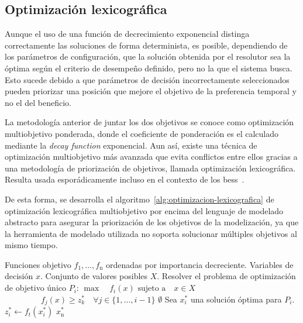 \subsection{Optimización lexicográfica}%
\label{makereference5.3.1}

Aunque el uso de una función de decrecimiento exponencial distinga correctamente las soluciones de forma determinista, es posible, dependiendo de los parámetros de configuración, que la solución obtenida por el resolutor sea la óptima según el criterio de desempeño definido, pero no la que el sistema busca. Esto sucede debido a que parámetros de decisión incorrectamente seleccionados pueden priorizar una posición que mejore el objetivo de la preferencia temporal y no el del beneficio.

La metodología anterior de juntar los dos objetivos se conoce como optimización multiobjetivo ponderada, donde el coeficiente de ponderación es el calculado mediante la \textit{decay function} exponencial. Aun así, existe una técnica de optimización multiobjetivo más avanzada que evita conflictos entre ellos gracias a una metodología de priorización de objetivos, llamada optimización lexicográfica. Resulta usada esporádicamente incluso en el contexto de los \gls{bess}~\cite{karimi2019multi}.

De esta forma, se desarrolla el algoritmo~\ref{alg:optimizacion-lexicografica} de optimización lexicográfica multiobjetivo por encima del lenguaje de modelado abstracto para asegurar la priorización de los objetivos de la modelización, ya que la herramienta de modelado utilizada no soporta solucionar múltiples objetivos al mismo tiempo.

\begin{algorithm}
  \caption{Algoritmo de optimización lexicográfica}%
  \label{alg:optimizacion-lexicografica}
  \begin{algorithmic}
    \Require{} Funciones objetivo \( f_{1}, \dots, f_{\mathrm{n}} \) ordenadas por importancia decreciente.
    \Require{} Variables de decisión \( x \).
    \Require{} Conjunto de valores posibles \( X \).
    \State{} Resolver el problema de optimización de objetivo único \( P_{i} \):
    \Statex{} \hspace{\algorithmicindent} \( \max \quad f_{i}(x) \)
    \Statex{} \hspace{\algorithmicindent} \( \text{sujeto a} \quad x \in X \)
    \Statex{} \hspace{\algorithmicindent} \( \phantom{\text{sujeto a} \quad} f_{j}(x) \geq z_k^* \quad \forall j \in \{1, \dots, i - 1\} \)
    \State{} \Return{} \( \emptyset \)
    \EndIf{}
    \State{} Sea \( x^{*}_{i} \) una solución óptima para \( P_{i} \).
    \State{} \( z^{*}_{i} \gets f_{t}(x^{*}_{i}) \) 
    \EndFor{}
    \State{} \Return{} \( x^{*}_{\mathrm{n}} \)
  \end{algorithmic}
\end{algorithm}

